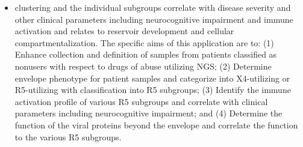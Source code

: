 \documentclass[a4paper,11pt]{article}
\makeatletter
\newenvironment{fullwidth}
    {\par
     \setlength{\@totalleftmargin}{0pt}%
     \setlength{\linewidth}{\hsize}%
     \list{}{\setlength{\leftmargin}{0pt}}
     \item\relax}
    {\endlist}
\makeatother
\begin{document}
\begin{enumerate}
\begin{itemize}
\begin{fullwidth}
clustering and the individual subgroups correlate with disease severity and other clinical parameters including neurocognitive impairment and immune activation and relates to reservoir development and cellular compartmentalization.  The specific aims of this application are to: (1) Enhance collection and definition of samples from patients classified as nonusers with respect to drugs of abuse utilizing NGS; (2) Determine envelope phenotype for patient samples and categorize into X4-utilizing or R5-utilizing with classification into R5 subgroups; (3) Identify the immune activation profile of various R5 subgroups and correlate with clinical parameters including neurocognitive impairment; and (4) Determine the function of the viral proteins beyond the envelope and correlate the function to the various R5 subgroups.
    \end{fullwidth}
    

\end{itemize}
\end{enumerate}
\end{document}
